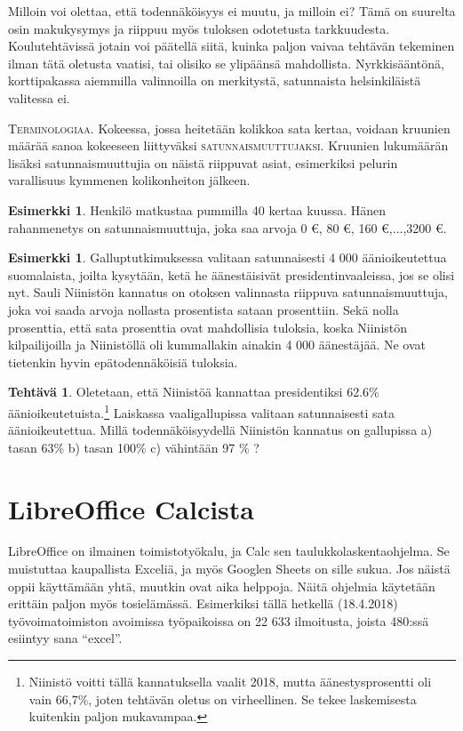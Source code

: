 \documentclass[12pt,leqno,a4paper,oneside]{amsart}
\theoremstyle{definition}
\newtheorem{example}[proclaim]{Esimerkki}
\newtheorem{exercise}{Tehtävä}
\theoremstyle{remark}
\numberwithin{equation}{section}
\begin{document}
Milloin voi olettaa, että todennäköisyys ei muutu, ja milloin ei? Tämä on suurelta osin makukysymys ja riippuu myös tuloksen odotetusta tarkkuudesta.
Koulutehtävissä jotain voi päätellä siitä, kuinka paljon vaivaa tehtävän tekeminen ilman tätä oletusta vaatisi, tai olisiko se ylipäänsä mahdollista.
Nyrkkisääntönä, korttipakassa aiemmilla valinnoilla on merkitystä, satunnaista helsinkiläistä valitessa ei. 

\textsc{Terminologiaa.} Kokeessa, jossa heitetään kolikkoa sata kertaa, voidaan kruunien määrää sanoa kokeeseen liittyväksi \textsc{satunnais\-muut\-tu\-jaksi.}
Kruunien lukumäärän lisäksi satunnaismuuttujia on näistä riippuvat asiat, esimerkiksi pelurin varallisuus kymmenen kolikonheiton jälkeen.
\begin{example}
 Henkilö matkustaa pummilla 40 kertaa kuussa. Hänen rahanmenetys on satunnaismuuttuja, joka saa arvoja 0 €, 80 €, 160 €,...,3200 €.
\end{example}
\begin{example}
 Galluptutkimuksessa valitaan satunnaisesti 4 000 ääni\-oikeutettua suomalaista, joilta kysytään, ketä he äänestäisivät presidentinvaaleissa, jos se olisi nyt.
 Sauli Niinistön kannatus on otoksen valinnasta riippuva satunnaismuuttuja, joka voi saada arvoja nollasta prosentista sataan prosenttiin. Sekä nolla prosenttia,
 että sata prosenttia ovat mahdollisia tuloksia, koska Niinistön kilpailijoilla ja Niinistöllä oli kummallakin ainakin 4 000 äänestäjää. Ne ovat tietenkin
 hyvin epätodennäköisiä tuloksia.
\end{example}

\begin{exercise}
 Oletetaan, että Niinistöä kannattaa presidentiksi 62.6\% äänioikeutetuista.\footnote{Niinistö voitti tällä kannatuksella vaalit 2018, mutta
 äänestysprosentti oli vain 66,7\%, joten tehtävän oletus on virheellinen. Se tekee laskemisesta kuitenkin paljon mukavampaa.}
 Laiskassa vaaligallupissa valitaan satunnaisesti sata äänioikeutettua.
 Millä todennäköisyydellä Niinistön kannatus on gal\-lu\-pis\-sa a) tasan 63\% b) tasan 100\% c) vähintään 97 \% ? 
\end{exercise}



\section{LibreOffice Calcista}

LibreOffice on ilmainen toimistotyökalu, ja Calc sen taulukkolaskentaohjelma. Se muistuttaa kaupallista Exceliä, ja myös Googlen Sheets on sille sukua.
Jos näistä oppii käyttämään yhtä, muutkin ovat aika helppoja. Näitä ohjelmia käytetään erittäin paljon myös tosielämässä. Esi\-merkiksi tällä hetkellä 
(18.4.2018) työvoimatoimiston avoimissa työ\-paikoissa on 22 633 ilmoitusta, joista 480:ssä esiintyy sana ``excel''.
\end{document}

